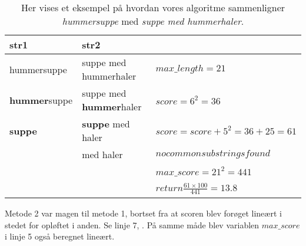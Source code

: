 \begin{table}
    \begin{tabular}{|l|l|l|}
        \hline
        str1        & str2                  & ~                             \\ \hline
hummersuppe & suppe med hummerhaler & $max\_length = 21$               \\         
        \textbf{hummer}suppe & suppe med \textbf{hummer}haler & $score = 6^2 = 36$               \\ 
        \textbf{suppe}       & \textbf{suppe} med haler       & $score = score + 5^2 = 36 + 25 = 61$                 \\ 
        ~           &  med haler            & $no common substrings found$        \\ 
        ~           & ~                     & $max\_score = 21^2  = 441$    \\ 
        ~           & ~                     & $return \frac{61 \times 100}{441} = 13.8$ \\
        \hline
    \end{tabular}
    \caption{Her vises et eksempel på hvordan vores algoritme sammenligner \textit{hummersuppe} med \textit{suppe med hummerhaler}.}
    \label{table:vores-compare-eksempel}
\end{table}

Metode 2 var magen til metode 1, bortset fra at scoren blev forøget lineært i stedet for opløftet i anden. Se linje 7, . På samme måde blev variablen $max\_score$ i linje 5 også beregnet lineært.

\begin{algorithm} [H]
	\label{alg:compare}
	
\end{algorithm}



